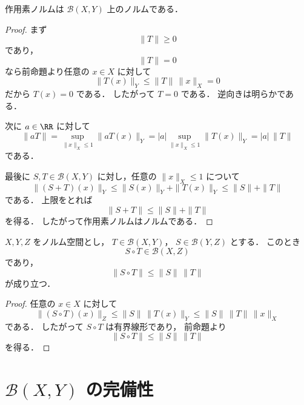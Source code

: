 \begin{proposition}
作用素ノルムは $\mathcal B(X,Y)$ 上のノルムである．
\end{proposition}
\begin{proof}
まず
\[
\|T\|\ge 0
\]
であり，
\[
\|T\|=0
\]
なら前命題より任意の $x\in X$ に対して
\[
\|T(x)\|_Y\le \|T\|\,\|x\|_X=0
\]
だから $T(x)=0$ である．
したがって $T=0$ である．
逆向きは明らかである．

次に $a\in\RR$ に対して
\[
\|aT\|
=
\sup_{\|x\|_X\le 1}\|aT(x)\|_Y
=
|a|\sup_{\|x\|_X\le 1}\|T(x)\|_Y
=
|a|\,\|T\|
\]
である．

最後に $S,T\in\mathcal B(X,Y)$ に対し，任意の $\|x\|_X\le 1$ について
\[
\|(S+T)(x)\|_Y
\le
\|S(x)\|_Y+\|T(x)\|_Y
\le
\|S\|+\|T\|
\]
である．
上限をとれば
\[
\|S+T\|\le \|S\|+\|T\|
\]
を得る．
したがって作用素ノルムはノルムである．
\end{proof}

\begin{proposition}[合成に関する評価]
$X,Y,Z$ をノルム空間とし，
$T\in\mathcal B(X,Y)$，
$S\in\mathcal B(Y,Z)$ とする．
このとき
\[
S\circ T\in\mathcal B(X,Z)
\]
であり，
\[
\|S\circ T\|\le \|S\|\,\|T\|
\]
が成り立つ．
\end{proposition}
\begin{proof}
任意の $x\in X$ に対して
\[
\|(S\circ T)(x)\|_Z
\le
\|S\|\,\|T(x)\|_Y
\le
\|S\|\,\|T\|\,\|x\|_X
\]
である．
したがって $S\circ T$ は有界線形であり，
前命題より
\[
\|S\circ T\|\le \|S\|\,\|T\|
\]
を得る．
\end{proof}

\section{\texorpdfstring{$\mathcal B(X,Y)$}{B(X,Y)} の完備性}

